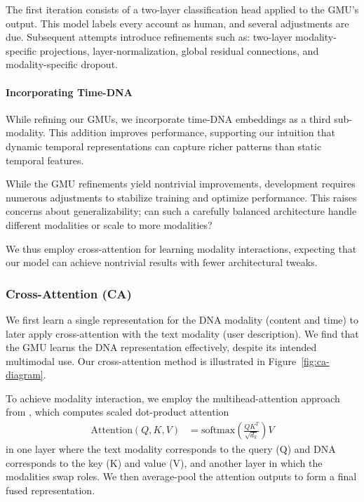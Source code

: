 \documentclass[conference]{IEEEtran}
\begin{document}
The first iteration consists of a two-layer classification head applied
to the GMU's output. This model labels every account as human,
and several adjustments are due. Subsequent attempts
introduce refinements such as: two-layer modality-specific projections, 
layer-normalization, global residual connections, and modality-specific dropout.

\paragraph{\textbf{Incorporating Time-DNA}}
While refining our GMUs, we incorporate
time-DNA embeddings as a third sub-modality.
This addition improves performance, 
supporting our intuition that dynamic temporal 
representations can capture richer patterns 
than static temporal features.

While the GMU refinements yield nontrivial improvements,
development requires numerous adjustments to stabilize training 
and optimize performance. 
This raises concerns about generalizability;
can such a carefully balanced architecture handle 
different modalities or scale to more modalities?

We thus employ cross-attention 
for learning modality interactions, 
expecting that our model can achieve nontrivial results with fewer 
architectural tweaks.

\subsubsection{\textbf{Cross-Attention (CA)}}
We first learn a single representation 
for the DNA modality (content and time)
to later apply cross-attention with the text modality (user description).
We find that the GMU learns the DNA representation effectively, 
despite its intended multimodal use. Our cross-attention method is illustrated in Figure~\ref{fig:ca-diagram}.

To achieve modality interaction, 
we employ the multihead-attention approach
from \citet{ilias2023multimodal},
which computes scaled dot-product attention \citep{vaswani2017attention}
\begin{align}
    \text{Attention}(Q, K, V) &= \text{softmax}(\frac{QK^{T}}{\sqrt{d_k}})V
\end{align}
in one layer where the text modality corresponds to the query (Q) 
and DNA corresponds to the key (K) and value (V), 
and another layer in which the modalities swap roles.
We then average-pool the attention outputs to form 
a final fused representation.
\end{document}
